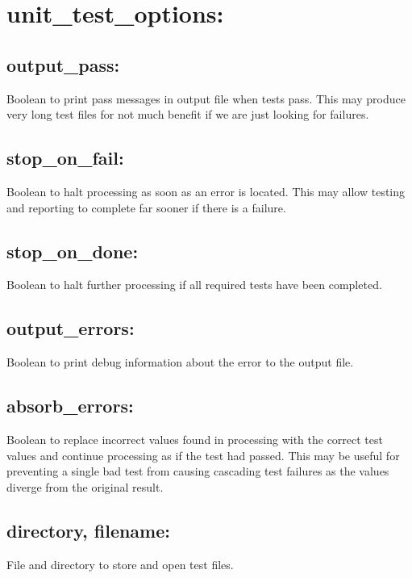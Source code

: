 \section{unit\_test\_options:}

\subsection*{output\_pass:}

Boolean to print pass messages in output file when tests pass. This may produce very long test files for not much benefit if we are just looking for failures.

\subsection*{stop\_on\_fail:}

Boolean to halt processing as soon as an error is located. This may allow testing and reporting to complete far sooner if there is a failure.

\subsection*{stop\_on\_done:}

Boolean to halt further processing if all required tests have been completed.

\subsection*{output\_errors:}

Boolean to print debug information about the error to the output file.

\subsection*{absorb\_errors:}

Boolean to replace incorrect values found in processing with the correct test values and continue processing as if the test had passed.
This may be useful for preventing a single bad test from causing cascading test failures as the values diverge from the original result.

\subsection*{directory, filename:}

File and directory to store and open test files.





